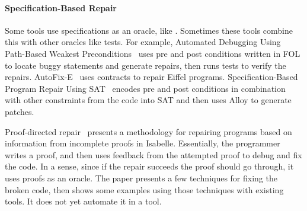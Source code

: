 
\paragraph{Specification-Based Repair} Some tools use specifications as an oracle, like \sysname.
Sometimes these tools combine this with other oracles like tests. %
For example, Automated Debugging Using Path-Based Weakest Preconditions~\cite{10.1007/978-3-540-24721-0_20} %
uses pre and post conditions written in FOL to locate buggy statements and generate repairs, 
then runs tests to verify the repairs. 
AutoFix-E~\cite{Wei:2010:AFP:1831708.1831716, pei2014automated} uses contracts
to repair Eiffel programs. %
Specification-Based Program Repair Using SAT~\cite{gopinath2011specification} %
encodes pre and post conditions in combination with other constraints from the code %
into SAT and then uses Alloy to generate patches. %


Proof-directed repair~\cite{dennis2006proof} presents a methodology
for repairing programs based on information from incomplete proofs in Isabelle.
Essentially, the programmer writes a proof, and then uses feedback
from the attempted proof to debug and fix the code.
In a sense, since if the repair succeeds the proof should go through,
it uses proofs as an oracle. The paper presents a few techniques for fixing the broken code,
then shows some examples using those techniques with existing tools.
It does not yet automate it in a tool.


